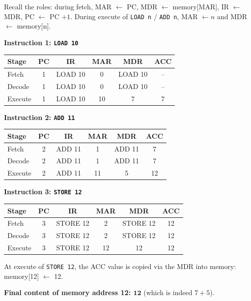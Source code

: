 \documentclass[11pt]{article}
\begin{document}
\begin{corrige}
Recall the roles: during fetch, MAR $\leftarrow$ PC, MDR $\leftarrow$ memory[MAR], IR $\leftarrow$ MDR, PC $\leftarrow$ PC $+1$. During execute of \texttt{LOAD n} / \texttt{ADD n}, MAR $\leftarrow n$ and MDR $\leftarrow$ memory[n].

\textbf{Instruction 1: \texttt{LOAD 10}}
\begin{center}
\begin{tabular}{|l|c|c|c|c|c|}
\hline
\rowcolor{popblueL} \textbf{Stage} & \textbf{PC} & \textbf{IR} & \textbf{MAR} & \textbf{MDR} & \textbf{ACC} \\
\hline
Fetch & 1 & LOAD 10 & 0 & LOAD 10 & -- \\
Decode & 1 & LOAD 10 & 0 & LOAD 10 & -- \\
Execute & 1 & LOAD 10 & 10 & 7 & 7 \\
\hline
\end{tabular}
\end{center}

\textbf{Instruction 2: \texttt{ADD 11}}
\begin{center}
\begin{tabular}{|l|c|c|c|c|c|}
\hline
\rowcolor{popblueL} \textbf{Stage} & \textbf{PC} & \textbf{IR} & \textbf{MAR} & \textbf{MDR} & \textbf{ACC} \\
\hline
Fetch & 2 & ADD 11 & 1 & ADD 11 & 7 \\
Decode & 2 & ADD 11 & 1 & ADD 11 & 7 \\
Execute & 2 & ADD 11 & 11 & 5 & 12 \\
\hline
\end{tabular}
\end{center}

\textbf{Instruction 3: \texttt{STORE 12}}
\begin{center}
\begin{tabular}{|l|c|c|c|c|c|}
\hline
\rowcolor{popblueL} \textbf{Stage} & \textbf{PC} & \textbf{IR} & \textbf{MAR} & \textbf{MDR} & \textbf{ACC} \\
\hline
Fetch & 3 & STORE 12 & 2 & STORE 12 & 12 \\
Decode & 3 & STORE 12 & 2 & STORE 12 & 12 \\
Execute & 3 & STORE 12 & 12 & 12 & 12 \\
\hline
\end{tabular}
\end{center}

At execute of \texttt{STORE 12}, the ACC value is copied via the MDR into memory: memory[12] $\leftarrow$ 12.

\textbf{Final content of memory address 12: $\mathbf{12}$} (which is indeed $7+5$).
\end{corrige}
\end{document}
